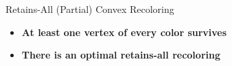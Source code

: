 \begin{frame}{Retains-All (Partial) Convex Recoloring}

\begin{itemize}

\item \textbf<1>
{At least one vertex of every color survives}

\item \textbf<2>
{There is an optimal retains-all recoloring}

\end{itemize}



\end{frame}

